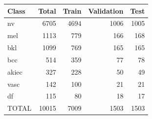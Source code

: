 \begin{tabular}{lrrrr}
\hline
Class & Total & Train & Validation & Test \\
\hline
nv & 6705 & 4694 & 1006 & 1005 \\
mel & 1113 & 779 & 166 & 168 \\
bkl & 1099 & 769 & 165 & 165 \\
bcc & 514 & 359 & 77 & 78 \\
akiec & 327 & 228 & 50 & 49 \\
vasc & 142 & 100 & 21 & 21 \\
df & 115 & 80 & 18 & 17 \\
TOTAL & 10015 & 7009 & 1503 & 1503 \\
\hline
\end{tabular}
